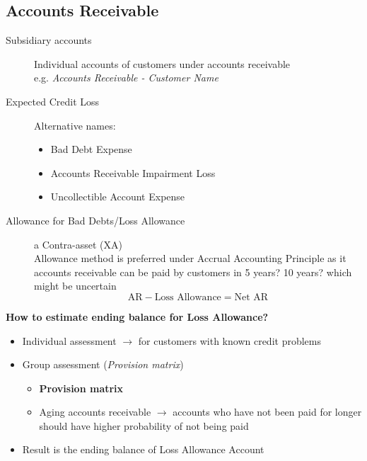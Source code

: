 \documentclass{article}
\begin{document}
\begin{multicols}{2}
\subsection{Accounts Receivable}
\begin{description}
	\item[Subsidiary accounts] Individual accounts of customers under accounts receivable\\
	e.g. \textit{Accounts Receivable - Customer Name}
	\item[Expected Credit Loss] Alternative names:
	\begin{itemize}
		\item Bad Debt Expense
		\item Accounts Receivable Impairment Loss
		\item Uncollectible Account Expense
	\end{itemize}
    \item[Allowance for Bad Debts/Loss Allowance] a Contra-asset (XA)\\
    Allowance method is preferred under Accrual Accounting Principle as it accounts receivable can be paid by customers in 5 years? 10 years? which might be uncertain
    $$\text{AR} - \text{Loss Allowance} = \text{Net AR}$$
\end{description}
\textbf{How to estimate ending balance for Loss Allowance?}
\begin{itemize}
	\item Individual assessment $\rightarrow$ for customers with known credit problems
	\item Group assessment (\textit{Provision matrix})
	\begin{itemize}
		\item \textbf{Provision matrix}
		\item Aging accounts receivable $\rightarrow$ accounts who have not been paid for longer should have higher probability of not being paid
	\end{itemize}
    \item Result is the ending balance of Loss Allowance Account
\end{itemize}

\end{multicols}
\end{document}
